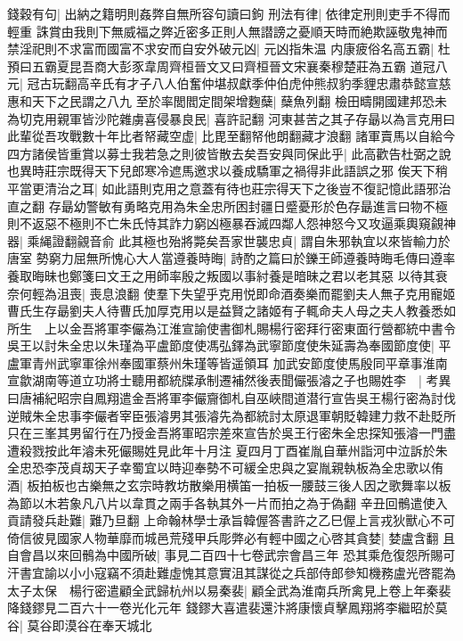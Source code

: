 錢穀有句|{
	出納之籍明則姦弊自無所容句讀曰鉤}
刑法有律|{
	依律定刑則吏手不得而輕重}
誅賞由我則下無威福之弊近密多正則人無譛謗之憂順天時而絶欺誣敬鬼神而禁淫祀則不求富而國富不求安而自安外破元凶|{
	元凶指朱温}
内康疲俗名高五霸|{
	杜預曰五霸夏昆吾商大彭豕韋周齊桓晉文又曰齊桓晉文宋襄秦穆楚莊為五霸}
道冠八元|{
	冠古玩翻高辛氏有才子八人伯奮仲堪叔獻季仲伯虎仲熊叔豹季貍忠肅恭懿宣慈惠和天下之民謂之八九}
至於率閭閻定間架增麴蘖|{
	蘖魚列翻}
檢田疇開國建邦恐未為切克用親軍皆沙陀雜虜喜侵暴良民|{
	喜許記翻}
河東甚苦之其子存朂以為言克用曰此輩從吾攻戰數十年比者帑藏空虚|{
	比毘至翻帑他朗翻藏才浪翻}
諸軍賣馬以自給今四方諸侯皆重賞以募士我若急之則彼皆散去矣吾安與同保此乎|{
	此高歡告杜弼之說也異時莊宗既得天下兒郎寒冷遮馬邀求以養成驕軍之禍得非此語誤之邪}
俟天下稍平當更清治之耳|{
	如此語則克用之意蓋有待也莊宗得天下之後豈不復記憶此語邪治直之翻}
存朂幼警敏有勇略克用為朱全忠所困封疆日蹙憂形於色存朂進言曰物不極則不返惡不極則不亡朱氏恃其詐力窮凶極暴吞滅四鄰人怨神怒今又攻逼乘輿窺覦神器|{
	乘䋲證翻覦音俞}
此其極也殆將斃矣吾家世襲忠貞|{
	謂自朱邪執宜以來皆輸力於唐室}
勢窮力屈無所愧心大人當遵養時晦|{
	詩酌之篇曰於鑠王師遵養時晦毛傳曰遵率養取晦昧也鄭箋曰文王之用師率殷之叛國以事紂養是暗昧之君以老其惡}
以待其衰奈何輕為沮喪|{
	喪息浪翻}
使羣下失望乎克用悦即命酒奏樂而罷劉夫人無子克用寵姬曹氏生存朂劉夫人待曹氏加厚克用以是益賢之諸姬有子輒命夫人母之夫人教養悉如所生　上以金吾將軍李儼為江淮宣諭使書御札賜楊行密拜行密東面行營都統中書令吳王以討朱全忠以朱瑾為平盧節度使馮弘鐸為武寧節度使朱延壽為奉國節度使|{
	平盧軍青州武寧軍徐州奉國軍蔡州朱瑾等皆遥領耳}
加武安節度使馬殷同平章事淮南宣歙湖南等道立功將士聽用都統牒承制遷補然後表聞儼張濬之子也賜姓李　|{
	考異曰唐補紀昭宗自鳳翔遣金吾將軍李儼齎御札自巫峽間道潜行宣告吳王楊行密為討伐逆賊朱全忠事李儼者宰臣張濬男其張濬先為都統討太原退軍朝貶韓建力救不赴貶所只在三峯其男留行在乃授金吾將軍昭宗差來宣告於吳王行密朱全忠探知張濬一門盡遭殺戮按此年濬未死儼賜姓見此年十月注}
夏四月丁酉崔胤自華州詣河中泣訴於朱全忠恐李茂貞刼天子幸蜀宜以時迎奉勢不可緩全忠與之宴胤親執板為全忠歌以侑酒|{
	板拍板也古樂無之玄宗時教坊散樂用横笛一拍板一腰鼓三後人因之歌舞率以板為節以木若象凡八片以韋貫之兩手各執其外一片而拍之為于偽翻}
辛丑回鶻遣使入貢請發兵赴難|{
	難乃旦翻}
上命翰林學士承旨韓偓答書許之乙巳偓上言戎狄獸心不可倚信彼見國家人物華靡而城邑荒殘甲兵彫弊必有輕中國之心啓其貪婪|{
	婪盧含翻}
且自會昌以來回鶻為中國所破|{
	事見二百四十七卷武宗會昌三年}
恐其乘危復怨所賜可汗書宜諭以小小寇竊不須赴難虛愧其意實沮其謀從之兵部侍郎參知機務盧光啓罷為太子太保　楊行密遣顧全武歸杭州以易秦裴|{
	顧全武為淮南兵所禽見上卷上年秦裴降錢鏐見二百六十一卷光化元年}
錢鏐大喜遣裴還汴將康懷貞擊鳳翔將李繼昭於莫谷|{
	莫谷即漠谷在奉天城北}


